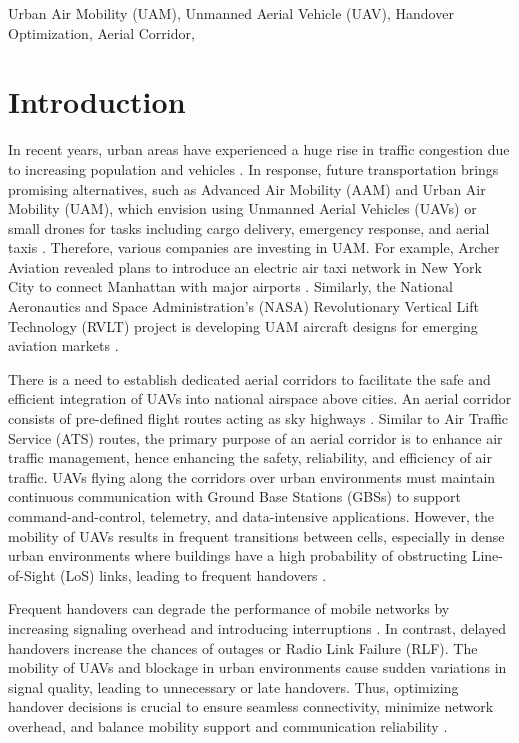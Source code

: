 \documentclass[conference]{IEEEtran}
\begin{document}
\begin{IEEEkeywords}
Urban Air Mobility (UAM), Unmanned
Aerial Vehicle (UAV), Handover Optimization, Aerial Corridor, 
\end{IEEEkeywords}



\section{Introduction}
In recent years, urban areas have experienced a huge rise in traffic congestion due to increasing population and vehicles \cite{10718279}. In response, future transportation brings promising alternatives, such as Advanced Air Mobility (AAM) and Urban Air Mobility (UAM), which envision using Unmanned Aerial Vehicles (UAVs) or small drones for tasks including cargo delivery, emergency response, and aerial taxis \cite{cohen2021urban, 10793277}. Therefore, various companies are investing in UAM. For example, Archer Aviation revealed plans to introduce an electric air taxi network in New York City to connect Manhattan with major airports \cite{archer2025nyc}. Similarly, the National Aeronautics and Space Administration’s (NASA) Revolutionary Vertical Lift Technology (RVLT) project is developing UAM aircraft designs for emerging aviation markets \cite{johnson2022nasa}.

There is a need to establish dedicated aerial corridors to facilitate the safe and efficient integration of UAVs into national airspace above cities. An aerial corridor consists of pre-defined flight routes acting as sky highways \cite{10594734}. Similar to Air Traffic Service (ATS) routes, the primary purpose of an aerial corridor is to enhance air traffic management, hence enhancing the safety, reliability, and efficiency of air traffic. UAVs flying along the corridors over urban environments must maintain continuous communication with Ground Base Stations (GBSs) to support command-and-control, telemetry, and data-intensive applications. However, the mobility of UAVs results in frequent transitions between cells, especially in dense urban environments where buildings have a high probability of obstructing Line-of-Sight (LoS) links, leading to frequent handovers \cite{10746345}.

Frequent handovers can degrade the performance of mobile networks by increasing signaling overhead and introducing interruptions \cite{sonmez2024handover}. In contrast, delayed handovers increase the chances of outages or Radio Link Failure (RLF). The mobility of UAVs and blockage in urban environments cause sudden variations in signal quality, leading to unnecessary or late handovers. Thus, optimizing handover decisions is crucial to ensure seamless connectivity, minimize network overhead, and balance mobility support and communication reliability \cite{ullah2023survey}. 
\end{document}
